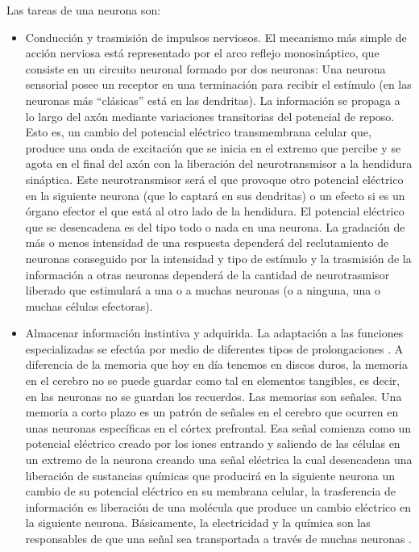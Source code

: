 Las tareas de una neurona son:
\begin{itemize}
\item Conducción y trasmisión de impulsos nerviosos. El mecanismo más simple de acción nerviosa está representado por el arco reflejo monosináptico, que consiste en un circuito neuronal formado por dos neuronas: Una neurona sensorial posee un receptor en una terminación para recibir el estímulo (en las neuronas más “clásicas” está en las dendritas). La información se propaga a lo largo del axón mediante variaciones transitorias del potencial de reposo. Esto es, un cambio del potencial eléctrico transmembrana celular que, produce una onda de excitación que se inicia en el extremo que percibe y se agota en el final del axón con la liberación del neurotransmisor a la hendidura sináptica. Este neurotransmisor será el que provoque otro potencial eléctrico en la siguiente neurona (que lo captará en sus dendritas) o un efecto si es un órgano efector el que está al otro lado de la hendidura. El potencial eléctrico que se desencadena es del tipo todo o nada en una neurona. La gradación de más o menos intensidad de una respuesta dependerá del reclutamiento de neuronas conseguido por la intensidad y tipo de estímulo y la trasmisión de la información a otras neuronas dependerá de la cantidad de neurotrasmisor liberado que estimulará a una o a muchas neuronas (o a ninguna, una o muchas células efectoras)\cite{noback}.
\item Almacenar información instintiva y adquirida. La adaptación a las funciones especializadas se efectúa por medio de diferentes tipos de prolongaciones \cite{noback}. A diferencia de la memoria que hoy en día tenemos en discos duros, la memoria en el cerebro no se puede guardar como tal en elementos tangibles, es decir, en las neuronas no se guardan los recuerdos. Las memorias son señales. Una memoria a corto plazo es un patrón de señales en el cerebro que ocurren en unas neuronas específicas en el córtex prefrontal. Esa señal comienza como un potencial eléctrico creado por los iones entrando y saliendo de las células en un extremo de la neurona creando una señal eléctrica la cual desencadena una liberación de sustancias químicas que producirá en la siguiente neurona un cambio de su potencial eléctrico en su membrana celular, la trasferencia de información es liberación de una molécula que produce un cambio eléctrico en la siguiente neurona. Básicamente, la electricidad y la química son las responsables de que una señal sea transportada a través de muchas neuronas \cite{brainmemory}.\newline


\end{itemize}
